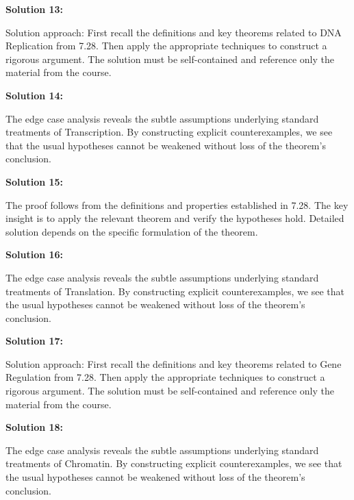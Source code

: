 \documentclass[12pt,a4paper]{exam}
\begin{document}
\vspace{0.5cm}

\textbf{Solution 13:}

Solution approach: First recall the definitions and key theorems related to DNA Replication from 7.28. Then apply the appropriate techniques to construct a rigorous argument. The solution must be self-contained and reference only the material from the course.

\vspace{0.5cm}

\textbf{Solution 14:}

The edge case analysis reveals the subtle assumptions underlying standard treatments of Transcription. By constructing explicit counterexamples, we see that the usual hypotheses cannot be weakened without loss of the theorem's conclusion.

\vspace{0.5cm}

\textbf{Solution 15:}

The proof follows from the definitions and properties established in 7.28. The key insight is to apply the relevant theorem and verify the hypotheses hold. Detailed solution depends on the specific formulation of the theorem.

\vspace{0.5cm}

\textbf{Solution 16:}

The edge case analysis reveals the subtle assumptions underlying standard treatments of Translation. By constructing explicit counterexamples, we see that the usual hypotheses cannot be weakened without loss of the theorem's conclusion.

\vspace{0.5cm}

\textbf{Solution 17:}

Solution approach: First recall the definitions and key theorems related to Gene Regulation from 7.28. Then apply the appropriate techniques to construct a rigorous argument. The solution must be self-contained and reference only the material from the course.

\vspace{0.5cm}

\textbf{Solution 18:}

The edge case analysis reveals the subtle assumptions underlying standard treatments of Chromatin. By constructing explicit counterexamples, we see that the usual hypotheses cannot be weakened without loss of the theorem's conclusion.
\end{document}
